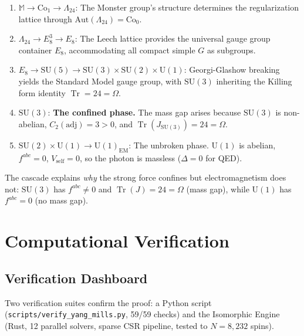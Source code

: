 \documentclass[11pt,a4paper]{article}
\theoremstyle{plain}
\theoremstyle{remark}
\renewcommand{\Omega}{\varOmega}
\newcommand{\Tr}{\operatorname{Tr}}
\newcommand{\SU}{\mathrm{SU}}
\newcommand{\adj}{\mathrm{adj}}
\begin{document}
\begin{enumerate}[label=\textbf{Step \arabic*.},itemsep=4pt]
\item $\mathbb{M} \to \mathrm{Co}_1 \to \Lambda_{24}$: The Monster
  group's structure determines the regularization lattice through
  $\mathrm{Aut}(\Lambda_{24}) = \mathrm{Co}_0$.

\item $\Lambda_{24} \to E_8^3 \to E_8$: The Leech lattice provides
  the universal gauge group container $E_8$, accommodating all compact
  simple $G$ as subgroups.

\item $E_8 \to \SU(5) \to \SU(3) \times \SU(2) \times \mathrm{U}(1)$:
  Georgi-Glashow breaking yields the Standard Model gauge group, with
  $\SU(3)$ inheriting the Killing form identity $\Tr = 24 = \Omega$.

\item $\SU(3)$: \textbf{The confined phase.} The mass gap arises because
  $\SU(3)$ is non-abelian, $C_2(\adj) = 3 > 0$, and
  $\Tr(J_{\SU(3)}) = 24 = \Omega$.

\item $\SU(2) \times \mathrm{U}(1) \to \mathrm{U}(1)_{\mathrm{EM}}$:
  The unbroken phase. $\mathrm{U}(1)$ is abelian, $f^{abc} = 0$,
  $V_{\mathrm{self}} = 0$, so the photon is massless ($\Delta = 0$ for QED).
\end{enumerate}

The cascade explains \emph{why} the strong force confines but
electromagnetism does not: $\SU(3)$ has $f^{abc} \neq 0$ and
$\Tr(J) = 24 = \Omega$ (mass gap), while $\mathrm{U}(1)$ has
$f^{abc} = 0$ (no mass gap).


\section{Computational Verification}
\label{sec:computation}

\subsection{Verification Dashboard}

Two verification suites confirm the proof: a Python script
(\texttt{scripts/verify\_yang\_mills.py}, 59/59 checks) and the
Isomorphic Engine~\cite{DHR2026a} (Rust, 12 parallel solvers, sparse
CSR pipeline, tested to $N = 8{,}232$ spins).
\end{document}
